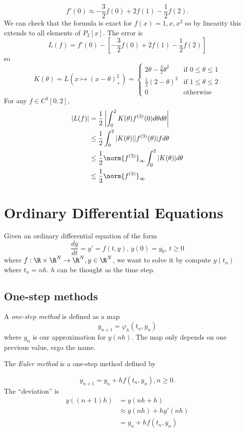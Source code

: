 \documentclass[a4paper]{article}
\begin{document}
\begin{eg}
  \[
    f'(0) \approx -\frac{3}{2}f(0) + 2f(1) - \frac{1}{2}f(2).
  \]
  We can check that the formula is exact for \(f(x) = 1, x, x^2\) so by linearity this extends to all elements of \(P_2[x]\). The error is
  \[
    L(f) = f'(0) - [-\frac{3}{2}f(0) + 2f(1) - \frac{1}{2}f(2)]
  \]
  so
  \[
    K(\theta) = L(x \mapsto (x - \theta)_+^2) =
    \begin{cases}
      2\theta - \frac{3}{2}\theta^2 & \text{if } 0 \leq \theta \leq 1 \\
      \frac{1}{2}(2 - \theta)^2 & \text{if } 1 \leq \theta \leq 2 \\
      0 & \text{otherwise}
    \end{cases}
  \]
  For any \(f \in C^3[0, 2]\),
  \begin{align*}
    |L(f)|
    &= \frac{1}{2} \left| \int_0^2 K(\theta)f^{(3)}(0)d\theta d\theta \right| \\
    &\leq \frac{1}{2} \int_0^2 |K(\theta)||f^{(3)}(\theta)|fd\theta \\
    &\leq \frac{1}{2} \norm{f^{(3)}}_\infty \int_0^2 |K(\theta)| d\theta \\
    &\leq \frac{1}{3} \norm{f^{(3)}}_\infty
  \end{align*}
\end{eg}

\section{Ordinary Differential Equations}

Given an ordinary differential equation of the form
\[
  \frac{dy}{dt} = y' = f(t, y),\, y(0) = y_0,\, t \geq 0
\]
where \(f: \R \times \R^N \to \R^N, y \in \R^N\), we want to solve it by compute \(y(t_n)\) where \(t_n = nh\). \(h\) can be thought as the time step.

\subsection{One-step methods}

A \emph{one-step method} is defined as a map
\[
  y_{n + 1} = \varphi_h(t_n, y_n)
\]
where \(y_n\) is our approximation for \(y(nh)\). The map only depends on one previous value, ergo the name.

The \emph{Euler method} is a one-step method defined by

\[
  y_{n + 1} = y_n + hf(t_n, y_n), n \geq 0.
\]
The ``deviation'' is
\begin{align*}
  y((n + 1)h)
  &= y(nh + h) \\
  &\approx y(nh) + hy'(nh) \\
  &= y_n + hf(t_n, y_n)
\end{align*}
\end{document}

